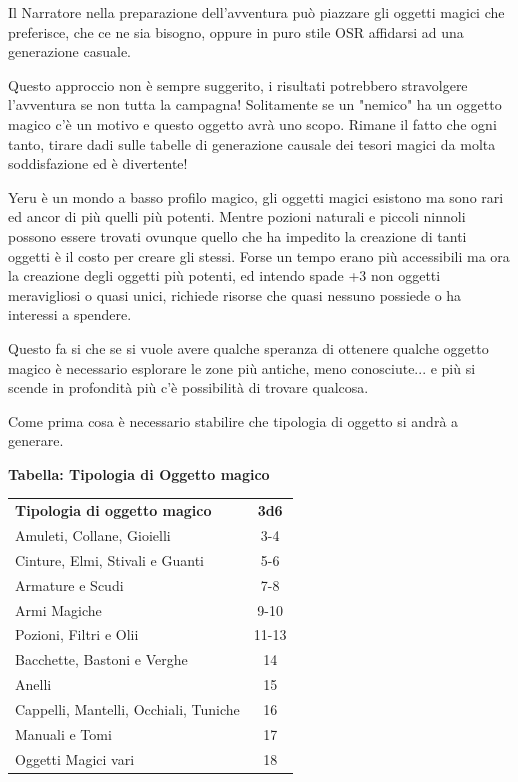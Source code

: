 \begin{multicols}{2}

Il Narratore nella preparazione dell'avventura può piazzare gli oggetti magici che preferisce, che ce ne sia bisogno, oppure in puro stile OSR affidarsi ad una generazione casuale.

Questo approccio non è sempre suggerito, i risultati potrebbero stravolgere l'avventura se non tutta la campagna! Solitamente se un "nemico" ha un oggetto magico c'è un motivo e questo oggetto avrà uno scopo. Rimane il fatto che ogni tanto, tirare dadi sulle tabelle di generazione causale dei tesori magici da molta soddisfazione ed è divertente!

\begin{changemargin}{0.3cm}{0.3cm}\begin{narratore}   %
Yeru è un mondo a basso profilo magico, gli oggetti magici esistono ma sono rari ed ancor di più quelli più potenti. Mentre pozioni naturali e piccoli ninnoli possono essere trovati ovunque quello che ha impedito la creazione di tanti oggetti è il costo per creare gli stessi. Forse un tempo erano più accessibili ma ora la creazione degli oggetti più potenti, ed intendo spade +3 non oggetti meravigliosi o quasi unici, richiede risorse che quasi nessuno possiede o ha interessi a spendere.

Questo fa si che se si vuole avere qualche speranza di ottenere qualche oggetto magico è necessario esplorare le zone più antiche, meno conosciute... e più si scende in profondità più c'è possibilità di trovare qualcosa.
\end{narratore}\end{changemargin}

Come prima cosa è necessario stabilire che tipologia di oggetto si andrà a generare.

\medskip

\textbf{Tabella: Tipologia di Oggetto magico}

\medskip

\begin{tabular}{lc}
\textbf{Tipologia di oggetto magico}&\textbf{3d6}\\
Amuleti, Collane, Gioielli&3-4\\
Cinture, Elmi, Stivali e Guanti&5-6\\
Armature e Scudi&7-8\\
Armi Magiche&9-10\\
Pozioni, Filtri e Olii&11-13\\
Bacchette, Bastoni e Verghe&14\\
Anelli&15\\
Cappelli, Mantelli, Occhiali, Tuniche&16\\
Manuali e Tomi&17\\
Oggetti Magici vari&18\\
\end{tabular}


\end{multicols}
